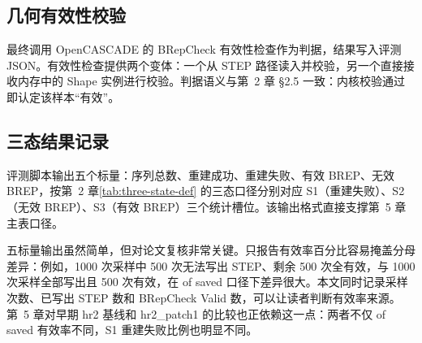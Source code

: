 \subsection{几何有效性校验}

最终调用 OpenCASCADE 的 BRepCheck 有效性检查作为判据，结果写入评测 JSON。有效性检查提供两个变体：一个从 STEP 路径读入并校验，另一个直接接收内存中的 Shape 实例进行校验。判据语义与第~2 章 §2.5 一致：内核校验通过即认定该样本“有效”。

\subsection{三态结果记录}

评测脚本输出五个标量：序列总数、重建成功、重建失败、有效 BREP、无效 BREP，按第~2 章\autoref{tab:three-state-def} 的三态口径分别对应 S1（重建失败）、S2（无效 BREP）、S3（有效 BREP）三个统计槽位。该输出格式直接支撑第~5 章主表口径。

五标量输出虽然简单，但对论文复核非常关键。只报告有效率百分比容易掩盖分母差异：例如，1000 次采样中 500 次无法写出 STEP、剩余 500 次全有效，与 1000 次采样全部写出且 500 次有效，在 of saved 口径下差异很大。本文同时记录采样次数、已写出 STEP 数和 BRepCheck Valid 数，可以让读者判断有效率来源。第~5 章对早期 hr2 基线和 hr2\_patch1 的比较也正依赖这一点：两者不仅 of saved 有效率不同，S1 重建失败比例也明显不同。

